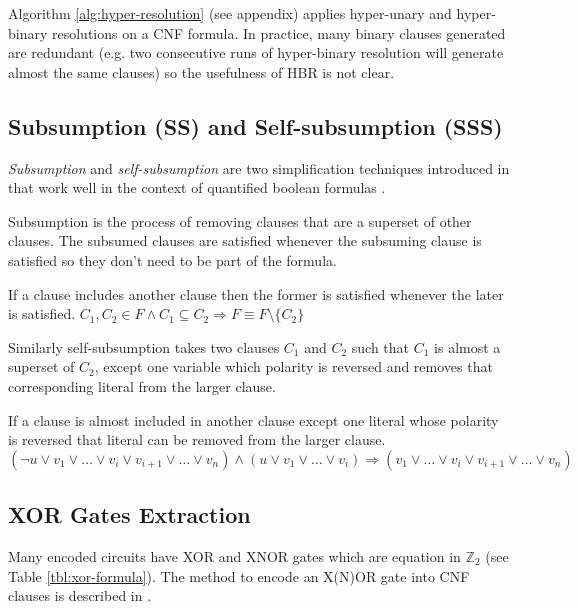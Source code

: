 Algorithm \ref{alg:hyper-resolution} (see appendix)
applies hyper-unary and hyper-binary resolutions on a CNF formula. In
practice, many binary clauses generated are redundant (e.g. two
consecutive runs of hyper-binary resolution will generate almost
the same clauses) so the usefulness of HBR is not clear.


\subsection{Subsumption (SS) and Self-subsumption (SSS)}
\label{ssec:sss}

\emph{Subsumption} and \emph{self-subsumption} are two simplification
techniques introduced in \cite{Een05effectivepreprocessing}
that work well in the context of quantified boolean formulas
\cite{Biere04resolveand}.

Subsumption is the process of removing clauses that are a superset
of other clauses. The subsumed clauses are satisfied whenever
the subsuming clause is satisfied so they don't need to be part of
the formula.

\begin{myprop}[Subsumption]
  If a clause includes another clause then the former is satisfied whenever the
  later is satisfied.
  $C_1, C_2 \in F \land C_1 \subseteq C_2 \Rightarrow F \equiv F \setminus \{
  C_2 \}$
\end{myprop}

Similarly self-subsumption takes two clauses $C_1$ and $C_2$ such
that $C_1$ is almost a superset of $C_2$, except one variable which
polarity is reversed and removes that corresponding literal from
the larger clause.

\begin{myprop}
  If a clause is almost included in another clause except one literal whose
  polarity is reversed that literal can be removed from the larger clause.
  $(\neg u \lor v_1 \lor \ldots \lor v_i \lor v_{i+1} \lor \ldots \lor v_n)
    \land (u \lor v_1 \lor \ldots \lor v_i)
    \Rightarrow (v_1 \lor \ldots \lor v_i \lor v_{i+1} \lor \ldots \lor v_n)$
\end{myprop}


\subsection{XOR Gates Extraction}
\label{ssec:xor-extraction}

Many encoded circuits have XOR and XNOR gates which are equation
in $\mathbb{Z}_2$ (see Table \ref{tbl:xor-formula}). The method
to encode an X(N)OR gate into CNF clauses is described in
\cite{Roy_restoringcircuit}.


